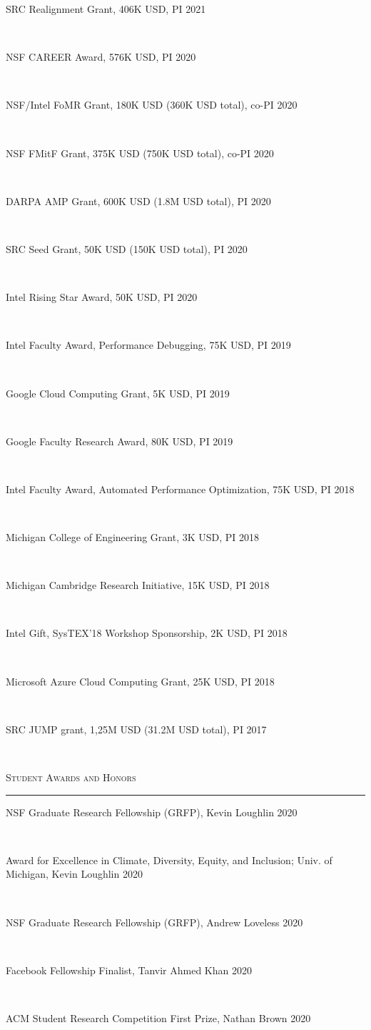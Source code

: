 \documentclass[10pt]{article}
\newcommand{\mysec}[1]{\vspace{2em}\textsc{\large #1}\vspace{1mm}\hrule\vspace{2mm}}
\newcommand{\myssub}[1]{\hspace*{2mm}\parbox{163mm}{#1}\vspace*{2mm}}
\begin{document}
\myssub{SRC Realignment Grant, 406K USD, PI \hfill 2021} \\
\myssub{NSF CAREER Award, 576K USD, PI \hfill 2020} \\
\myssub{NSF/Intel FoMR Grant, 180K USD (360K USD total), co-PI \hfill 2020} \\
\myssub{NSF FMitF Grant, 375K USD (750K USD total), co-PI \hfill 2020} \\
\myssub{DARPA AMP Grant, 600K USD (1.8M USD total), PI \hfill 2020} \\
\myssub{SRC Seed Grant, 50K USD (150K USD total), PI \hfill 2020} \\
\myssub{Intel Rising Star Award, 50K USD, PI \hfill 2020} \\
\myssub{Intel Faculty Award, Performance Debugging, 75K USD, PI \hfill 2019} \\
\myssub{Google Cloud Computing Grant, 5K USD, PI \hfill 2019} \\
\myssub{Google Faculty Research Award, 80K USD, PI \hfill 2019} \\
\myssub{Intel Faculty Award, Automated Performance Optimization, 75K USD, PI \hfill 2018} \\
\myssub{Michigan College of Engineering Grant, 3K USD, PI \hfill 2018} \\
\myssub{Michigan Cambridge Research Initiative, 15K USD, PI \hfill 2018} \\
\myssub{Intel Gift, SysTEX'18 Workshop Sponsorship, 2K USD, PI \hfill 2018} \\
\myssub{Microsoft Azure Cloud Computing Grant, 25K USD, PI \hfill 2018} \\
\myssub{SRC JUMP grant, 1,25M USD (31.2M USD total), PI \hfill 2017} \\

\newpage

\mysec{Student Awards and Honors}
\myssub{NSF Graduate Research Fellowship (GRFP), Kevin Loughlin \hfill 2020} \\
\myssub{Award for Excellence in Climate, Diversity, Equity, and Inclusion; Univ. of Michigan, Kevin Loughlin \hfill 2020} \\
\myssub{NSF Graduate Research Fellowship (GRFP), Andrew Loveless \hfill 2020} \\
\myssub{Facebook Fellowship Finalist, Tanvir Ahmed Khan \hfill 2020} \\
\myssub{ACM Student Research Competition First Prize, Nathan Brown \hfill 2020} \\
\end{document}
